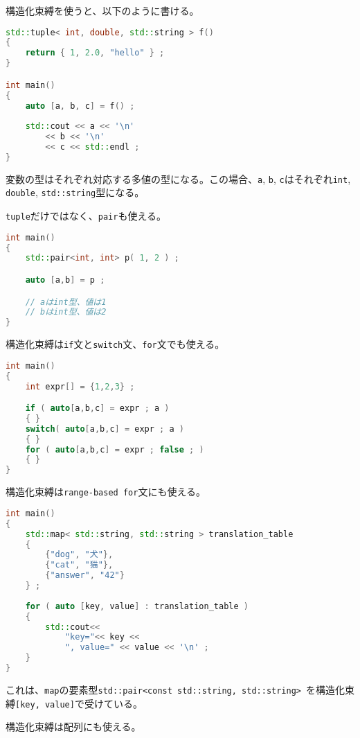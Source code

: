 構造化束縛を使うと、以下のように書ける。

\begin{lstlisting}[language=C++]
std::tuple< int, double, std::string > f()
{
    return { 1, 2.0, "hello" } ;
}

int main()
{
    auto [a, b, c] = f() ;
    
    std::cout << a << '\n' 
        << b << '\n'
        << c << std::endl ;
}
\end{lstlisting}

変数の型はそれぞれ対応する多値の型になる。この場合、\lstinline!a!,
\lstinline!b!, \lstinline!c!はそれぞれ\lstinline!int!,
\lstinline!double!, \lstinline!std::string!型になる。

\lstinline!tuple!だけではなく、\lstinline!pair!も使える。

\begin{lstlisting}[language=C++]
int main()
{
    std::pair<int, int> p( 1, 2 ) ;

    auto [a,b] = p ;

    // aはint型、値は1
    // bはint型、値は2
}
\end{lstlisting}

構造化束縛は\lstinline!if!文と\lstinline!switch!文、\lstinline!for!文でも使える。

\begin{lstlisting}[language=C++]
int main()
{
    int expr[] = {1,2,3} ;

    if ( auto[a,b,c] = expr ; a )
    { }
    switch( auto[a,b,c] = expr ; a )
    { }
    for ( auto[a,b,c] = expr ; false ; ) 
    { }
}
\end{lstlisting}

構造化束縛は\lstinline!range-based for!文にも使える。

\begin{lstlisting}[language=C++]
int main()
{
    std::map< std::string, std::string > translation_table
    {
        {"dog", "犬"},
        {"cat", "猫"},
        {"answer", "42"} 
    } ;
    
    for ( auto [key, value] : translation_table )
    {
        std::cout<<
            "key="<< key <<
            ", value=" << value << '\n' ;
    }
}
\end{lstlisting}

これは、\lstinline!map!の要素型\lstinline!std::pair<const std::string, std::string>!~を構造化束縛\lstinline![key, value]!で受けている。

構造化束縛は配列にも使える。

